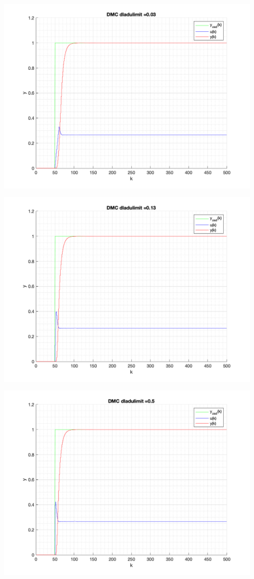 \documentclass[a4paper, 11pt]{article}
\begin{document}
\begin{enumerate}
 \includegraphics[width=\linewidth]{./ModelsP6_dulimit/P4_DMC_dulimit_0_03_png.png} 
 
 \includegraphics[width=\linewidth]{./ModelsP6_dulimit/P4_DMC_dulimit_0_13_png.png} 
 
 \includegraphics[width=\linewidth]{./ModelsP6_dulimit/P4_DMC_dulimit_0_5_png.png} 
 

\end{enumerate}
\end{document}
